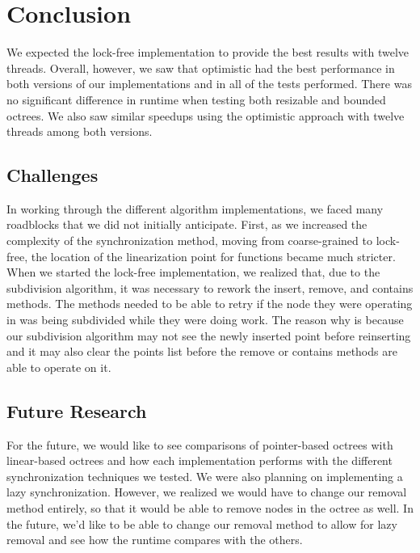 \documentclass[conference]{IEEEtran}
\begin{document}
\section{Conclusion} \label{sec:sec6}
We expected the lock-free implementation to provide the best results with twelve threads. Overall, however, we saw that optimistic had the best performance in both versions of our implementations and in all of the tests performed. There was no significant difference in runtime when testing both resizable and bounded octrees. We also saw similar speedups using the optimistic approach with twelve threads among both versions. 

\subsection{Challenges}
In working through the different algorithm implementations, we faced many roadblocks that we did not initially anticipate. First, as we increased the complexity of the synchronization method, moving from coarse-grained to lock-free, the location of the linearization point for functions became much stricter. When we started the lock-free implementation, we realized that, due to the subdivision algorithm, it was necessary to rework the insert, remove, and contains methods. The methods needed to be able to retry if the node they were operating in was being subdivided while they were doing work. The reason why is because our subdivision algorithm may not see the newly inserted point before reinserting and it may also clear the points list before the remove or contains methods are able to operate on it.

\subsection{Future Research}
For the future, we would like to see comparisons of pointer-based octrees with linear-based octrees and how each implementation performs with the different synchronization techniques we tested. We were also planning on implementing a lazy synchronization. However, we realized we would have to change our removal method entirely, so that it would be able to remove nodes in the octree as well. In the future, we'd like to be able to change our removal method to allow for lazy removal and see how the runtime compares with the others.


{}

\end{document}
